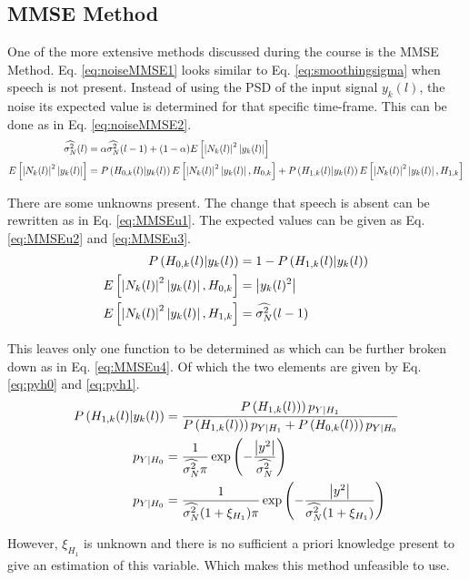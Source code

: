 \subsection{MMSE Method}
One of the more extensive methods discussed during the course is the MMSE Method. Eq.  \ref{eq:noiseMMSE1} looks similar to Eq. \ref{eq:smoothingsigma} when speech is not present. Instead of using the PSD of the input signal $y_k(l)$, the noise its expected value is determined for that specific time-frame. This can be done as in Eq. \ref{eq:noiseMMSE2}.
\begin{align}
  \widehat{\sigma_{N}^{2}}(l) &= \alpha \widehat{\sigma_{N}^{2}}(l-1) + (1-\alpha)E\left[ \abs{N_{k}(l)}^{2}\abs{y_{k}(l)}\right]
  \label{eq:noiseMMSE1} \\
  E\left[ \abs{N_{k}(l)}^{2}\abs{y_{k}(l)}\right] &=
  P\left(H_{0,k}(l)|y_{k}(l)\right) E\left[\abs{N_{k}(l)}^{2}\abs{y_{k}(l)},H_{0,k}\right] +
  P\left(H_{1,k}(l)|y_{k}(l)\right) E\left[\abs{N_{k}(l)}^{2}\abs{y_{k}(l)},H_{1,k}\right]
  \label{eq:noiseMMSE2}
\end{align}

There are some unknowns present. The change that speech is absent can be rewritten as in Eq. \ref{eq:MMSEu1}. The expected values can be given as Eq.  \ref{eq:MMSEu2} and \ref{eq:MMSEu3}.
\begin{align}
  P\left(H_{0,k}(l)|y_{k}(l)\right) &= 1 - P\left(H_{1,k}(l)|y_{k}(l)\right)
  \label{eq:MMSEu1} \\
  E\left[\abs{N_{k}(l)}^{2}\abs{y_{k}(l)},H_{0,k}\right] &= \abs{y_{k}(l)^{2}}
  \label{eq:MMSEu2} \\
  E\left[\abs{N_{k}(l)}^{2}\abs{y_{k}(l)},H_{1,k}\right] &= \widehat{\sigma_{N}^{2}}(l-1)
  \label{eq:MMSEu3}
\end{align}

This leaves only one function to be determined as which can be further broken down as in Eq. \ref{eq:MMSEu4}. Of which the two elements are given by Eq. \ref{eq:pyh0} and \ref{eq:pyh1}.
\begin{align}
  P\left(H_{1,k}(l)|y_{k}(l)\right) &= \frac{P\left(H_{1,k}(l))\right)p_{Y|H_{1}}}{P\left(H_{1,k}(l))\right)p_{Y|H_{1}} + P\left(H_{0,k}(l))\right)p_{Y|H_{0}}}
  \label{eq:MMSEu4}\\
  p_{Y|H_{0}} &= \frac{1}{\widehat{\sigma_{N}^{2}} \pi} \exp\left(-\frac{\abs{y^{2}}}{\widehat{\sigma_{N}^{2}}}\right)
  \label{eq:pyh0}\\
  p_{Y|H_{0}} &= \frac{1}{\widehat{\sigma_{N}^{2}} (1+\xi_{H_{1}})\pi} \exp\left(-\frac{\abs{y^{2}}}{\widehat{\sigma_{N}^{2}}(1+\xi_{H_{1}})}\right)
  \label{eq:pyh1}
\end{align}

However, $\xi_{H_{1}}$ is unknown and there is no sufficient a priori knowledge present to give an estimation of this variable. Which makes this method unfeasible to use.
